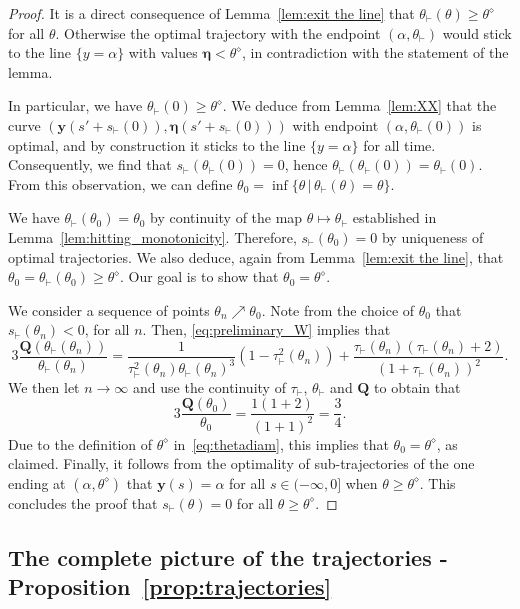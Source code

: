 \documentclass[10pt]{amsart}
\theoremstyle{definition}\newtheorem{defi}[theo]{Definition}\newtheorem{rema}[theo]{Remark}\newtheorem{exam}[theo]{Example}\newtheorem{exem}[theo]{Example}\newtheorem{nota}[theo]{Notation}
\newcommand{\bQ}{\mathbf{Q}}
\newcommand{\by}{\mathbf{y}}
\newcommand{\beeta}{\boldsymbol{\eta}}
\newcommand{\1}{\mathds{1}}
\newcommand{\sh}{s_{\vdash}}
\newcommand{\tauh}{\tau_{\vdash}}
\newcommand{\Thetastar}{\theta^{\diamond}}
\newcommand{\shh}{s_{\vdash}}
\newcommand{\htheta}{\theta_{\vdash}}
\begin{document}
\begin{proof}
It is a direct consequence of Lemma~\ref{lem:exit the line} that $\htheta(\theta)\geq \Thetastar$ for all $\theta$. Otherwise the optimal trajectory with the endpoint $(\alpha,\htheta)$ would stick to the line $\{y=\alpha\}$ with values $\beeta<\Thetastar$, in contradiction with the statement of the lemma.


In particular, we have $\htheta(0) \geq \Thetastar$. We deduce from Lemma~\ref{lem:XX} that the curve $(\by(s' + \shh(0)),\beeta(s' + \shh(0)))$ with endpoint $(\alpha,\htheta(0))$ is optimal, and by construction it sticks to the line $\{y=\alpha\}$ for all time. Consequently, we find that $\shh(\htheta(0)) = 0$, hence $\htheta(\htheta(0)) = \htheta(0)$. From this observation, we can define $\theta_0=\inf \{\theta \,| \, \htheta(\theta)=\theta\}$.

We have $\htheta(\theta_0) = \theta_0$ by continuity of the map $\theta\mapsto\htheta$ established in Lemma~\ref{lem:hitting_monotonicity}. Therefore, $\shh(\theta_0) = 0$ by uniqueness of optimal trajectories. We also deduce, again from Lemma~\ref{lem:exit the line}, that $\theta_0 = \htheta(\theta_0) \geq \Thetastar$. Our goal is to show that $\theta_0 = \Thetastar$.



We consider a sequence of points $\theta_n \nearrow \theta_0$. Note from the choice of $\theta_0$ that $\sh(\theta_n)<0$, for all $n$. Then, \eqref{eq:preliminary_W} implies that
\[
3\frac{\bQ\left(\htheta(\theta_n)\right)}{\htheta(\theta_n)} = \frac{1}{\tauh^2(\theta_n)\htheta(\theta_n)^3}\left(1-\tauh^2(\theta_n)\right) + \frac{\tauh(\theta_n) \left(\tauh(\theta_n)+2\right)}{\left(1+\tauh(\theta_n)\right)^2}.
\]
We then let $n\to \infty$ and use the continuity of $\tauh$, $\htheta$ and $\bQ$ to obtain that
\[
3\frac{\bQ(\theta_0)}{\theta_0} = \frac{1 (1 + 2)}{(1 + 1)^2} = \frac{3}{4}.
\]
Due to the definition of $\Thetastar$ in~\eqref{eq:thetadiam}, this implies that $\theta_0 = \Thetastar$, as claimed. Finally, it follows from the optimality of sub-trajectories of the one ending at $(\alpha,\Thetastar)$ that $\by(s) = \alpha$ for all $s\in (-\infty,0]$ when $\theta\geq \Thetastar$. This concludes the proof that $\shh(\theta) = 0$ for all $\theta\geq \Thetastar$.
\end{proof}



\subsection{The complete picture of the trajectories - Proposition~\ref{prop:trajectories}}\label{sec:proposition_compilation}
\end{document}
